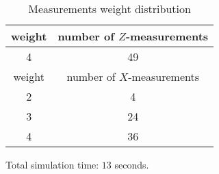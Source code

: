 \documentclass[12pt]{article}
\begin{document}
\begin{table}[h]
\centering
\begin{tabular}{c c}
\hline
weight & number of $Z$-measurements\\
\hline
4 & 49\\
\hline
\hline
weight & number of $X$-measurements\\
\hline
2 & 4\\
3 & 24\\
4 & 36\\
\hline
\end{tabular}
\caption{Measurements weight distribution}
\end{table}
\vspace{.3cm}



\vspace{2cm}
Total simulation time: $13$ seconds.
\end{document}
